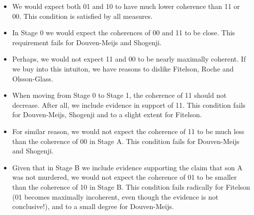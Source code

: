 \documentclass[10pt,]{scrartcl}
\begin{document}
\begin{itemize}
    \item We would expect both 01 and 10 to have much lower coherence than 11 or 00. This condition is satisfied by all measures.
    \item  In Stage 0 we would expect the coherences of 00 and 11 to be close. This requirement fails for Douven-Meijs and Shogenji.
    \item Perhaps, we would not expect 11 and 00 to be nearly maximally coherent. If we buy into this intuiton, we have reasons to dislike Fitelson, Roche and Olsson-Glass.
    \item When moving from Stage 0 to Stage 1, the coherence of 11 should not decrease. After all, we include evidence in support of 11. This condition fails for Douven-Meijs, Shogenji and to a slight extent for Fitelson.
    \item For similar reason, we would not expect the coherence of 11 to be much less than the coherence of 00 in Stage A. This condition fails for Douven-Meijs and Shogenji.
    \item Given that in Stage B we include evidence supporting the claim that son A was not murdered, we would not expect the coherence of 01 to be smaller than the coherence of 10 in Stage B. This condition fails radically for Fitelson (01 becomes maximally incoherent, even though the evidence is not conclusive!), and to a small degree for Douven-Meijs.
\end{itemize}
\end{document}
